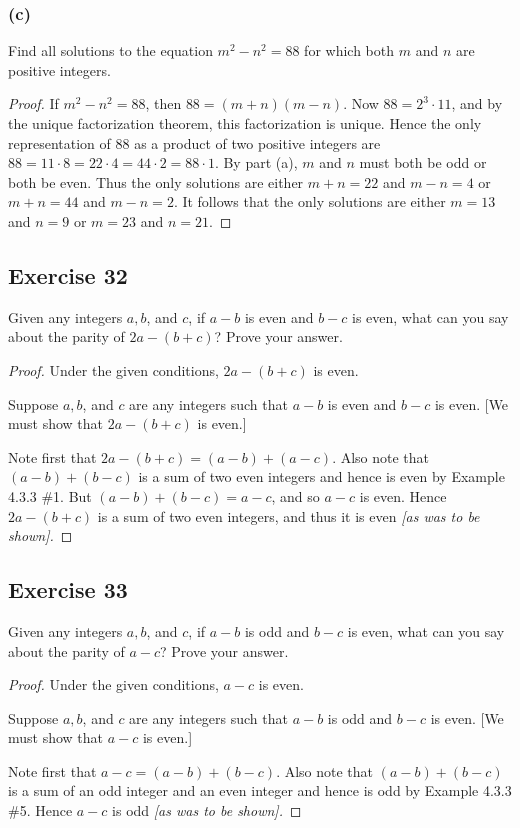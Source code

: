\documentclass[14pt]{extarticle}
\begin{document}
\subsubsection{(c)}
Find all solutions to the equation $m^2 - n^2 = 88$ for which both $m$ and $n$ are positive integers.

\begin{proof}
If $m^2 - n^2 = 88$, then $88 = (m + n)(m - n)$. Now $88 = 2^3 \cdot 11$, and by the unique factorization theorem, this factorization is unique. Hence the only representation of 88 as a product of two positive integers are $88 = 11\cdot8 = 22\cdot4 = 44\cdot2 = 88\cdot1$. By part (a), $m$ and $n$ must both be odd or both be even. Thus the only solutions are either $m + n = 22$ and $m - n = 4$ or $m + n = 44$ and $m - n = 2$. It follows that the only solutions are either $m = 13$ and $n = 9$ or $m = 23$ and $n = 21$.
\end{proof}

\subsection{Exercise 32}
Given any integers $a, b$, and $c$, if $a - b$ is even and $b - c$ is even, what can you say about the parity of $2a - (b + c)$? Prove your answer.

\begin{proof}
Under the given conditions, $2a - (b + c)$ is even.

Suppose $a, b$, and $c$ are any integers such that $a - b$
is even and $b - c$ is even. [We must show that $2a - (b + c)$ is even.] 

Note first that $2a - (b + c) = (a - b) + (a - c)$. Also note that $(a - b) + (b - c)$ is a sum of two even integers and hence is even by Example 4.3.3 \#1. But $(a - b) + (b - c) = a - c$, and so $a - c$ is even. Hence $2a - (b + c)$ is a sum of two even integers, and thus it is even {\it [as was to be shown].}
\end{proof}

\subsection{Exercise 33}
Given any integers $a, b$, and $c$, if $a - b$ is odd and
$b - c$ is even, what can you say about the parity of
$a - c$? Prove your answer.

\begin{proof}
Under the given conditions, $a - c$ is even.

Suppose $a, b$, and $c$ are any integers such that $a - b$
is odd and $b - c$ is even. [We must show that $a - c$ is even.] 

Note first that $a - c = (a - b) + (b - c)$. Also note that $(a - b) + (b - c)$ is a sum of an odd integer and an even integer and hence is odd by Example 4.3.3 \#5. Hence $a - c$ is odd {\it [as was to be shown].}
\end{proof}
\end{document}
